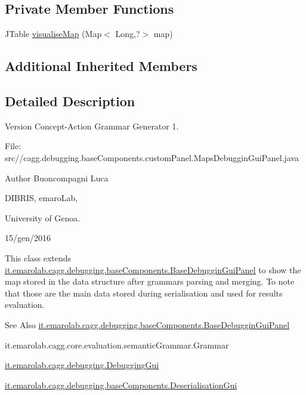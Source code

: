 \subsection*{Private Member Functions}
\begin{DoxyCompactItemize}
\item 
J\-Table \hyperlink{classit_1_1emarolab_1_1cagg_1_1debugging_1_1baseComponents_1_1customPanel_1_1MapsDebugginGuiPanel_a5b201e0df5ec502adb15d4e4a0a2b556}{visualise\-Map} (Map$<$ Long,?$>$ map)
\end{DoxyCompactItemize}
\subsection*{Additional Inherited Members}


\subsection{Detailed Description}
\begin{DoxyVersion}{Version}
Concept-\/\-Action Grammar Generator 1. \par
 File\-: src//cagg.debugging.\-base\-Components.\-custom\-Panel.\-Maps\-Debuggin\-Gui\-Panel.\-java \par

\end{DoxyVersion}
\begin{DoxyAuthor}{Author}
Buoncompagni Luca \par
 D\-I\-B\-R\-I\-S, emaro\-Lab,\par
 University of Genoa. \par
 15/gen/2016 \par

\end{DoxyAuthor}


This class extends \hyperlink{classit_1_1emarolab_1_1cagg_1_1debugging_1_1baseComponents_1_1BaseDebugginGuiPanel}{it.\-emarolab.\-cagg.\-debugging.\-base\-Components.\-Base\-Debuggin\-Gui\-Panel} to show the map stored in the data structure after grammars parsing and merging. To note that those are the main data stored during serialisation and used for results evaluation. 

\begin{DoxySeeAlso}{See Also}
\hyperlink{classit_1_1emarolab_1_1cagg_1_1debugging_1_1baseComponents_1_1BaseDebugginGuiPanel}{it.\-emarolab.\-cagg.\-debugging.\-base\-Components.\-Base\-Debuggin\-Gui\-Panel} 

it.\-emarolab.\-cagg.\-core.\-evaluation.\-semantic\-Grammar.\-Grammar 

\hyperlink{classit_1_1emarolab_1_1cagg_1_1debugging_1_1DebuggingGui}{it.\-emarolab.\-cagg.\-debugging.\-Debugging\-Gui} 

\hyperlink{classit_1_1emarolab_1_1cagg_1_1debugging_1_1baseComponents_1_1DeserialisationGui}{it.\-emarolab.\-cagg.\-debugging.\-base\-Components.\-Deserialisation\-Gui} 
\end{DoxySeeAlso}


